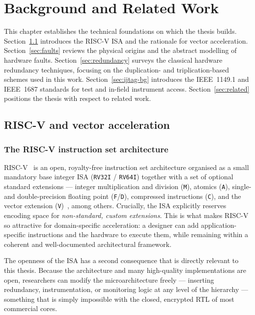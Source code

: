 \chapter{Background and Related Work}
\label{ch:background}

This chapter establishes the technical foundations on which the thesis builds.
Section~\ref{sec:riscv} introduces the RISC-V ISA and the rationale for vector
acceleration. Section~\ref{sec:faults} reviews the physical origins and the
abstract modelling of hardware faults. Section~\ref{sec:redundancy} surveys the
classical hardware redundancy techniques, focusing on the duplication- and
triplication-based schemes used in this work. Section~\ref{sec:ijtag-bg}
introduces the IEEE~1149.1 and IEEE~1687 standards for test and in-field
instrument access. Section~\ref{sec:related} positions the thesis with respect
to related work.

\section{RISC-V and vector acceleration}
\label{sec:riscv}

\subsection{The RISC-V instruction set architecture}

RISC-V~\cite{riscv-isa} is an open, royalty-free instruction set architecture organised as a
small mandatory base integer ISA (\texttt{RV32I} / \texttt{RV64I}) together with
a set of optional standard extensions --- integer multiplication and division
(\texttt{M}), atomics (\texttt{A}), single- and double-precision floating point
(\texttt{F}/\texttt{D}), compressed instructions (\texttt{C}), and the vector
extension (\texttt{V})~\cite{riscv-vector}, among others. Crucially, the ISA explicitly reserves
encoding space for \emph{non-standard, custom extensions}. This is what makes
RISC-V so attractive for domain-specific acceleration: a designer can add
application-specific instructions and the hardware to execute them, while
remaining within a coherent and well-documented architectural framework.

The openness of the ISA has a second consequence that is directly relevant to
this thesis. Because the architecture and many high-quality implementations are
open, researchers can modify the microarchitecture freely --- inserting
redundancy, instrumentation, or monitoring logic at any level of the hierarchy
--- something that is simply impossible with the closed, encrypted RTL of most
commercial cores.

